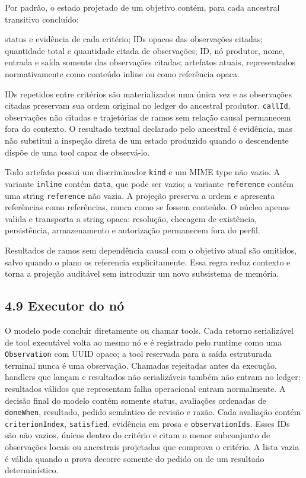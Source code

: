 \documentclass[12pt,a4paper]{article}
\begin{document}
Por padrão, o estado projetado de um objetivo contém, para cada ancestral transitivo concluído:


\noindent \textbullet{} status e evidência de cada critério; \textbullet{} IDs opacos das observações citadas; \textbullet{} quantidade total e quantidade citada de observações; \textbullet{} ID, nó produtor, nome, entrada e saída somente das observações citadas; \textbullet{} artefatos atuais, representados normativamente como conteúdo inline ou como referência opaca.\par

IDs repetidos entre critérios são materializados uma única vez e as observações citadas preservam sua ordem original no ledger do ancestral produtor. \texttt{callId}, observações não citadas e trajetórias de ramos sem relação causal permanecem fora do contexto. O resultado textual declarado pelo ancestral é evidência, mas não substitui a inspeção direta de um estado produzido quando o descendente dispõe de uma tool capaz de observá-lo.

Todo artefato possui um discriminador \texttt{kind} e um MIME type não vazio. A variante \texttt{inline} contém \texttt{data}, que pode ser vazio; a variante \texttt{reference} contém uma string \texttt{reference} não vazia. A projeção preserva a ordem e apresenta referências como referências, nunca como se fossem conteúdo. O núcleo apenas valida e transporta a string opaca: resolução, checagem de existência, persistência, armazenamento e autorização permanecem fora do perfil.

Resultados de ramos sem dependência causal com o objetivo atual são omitidos, salvo quando o plano os referencia explicitamente. Essa regra reduz contexto e torna a projeção auditável sem introduzir um novo subsistema de memória.



\subsection*{4.9 Executor do nó}

O modelo pode concluir diretamente ou chamar tools. Cada retorno serializável de tool executável volta ao mesmo nó e é registrado pelo runtime como uma \texttt{Observation} com UUID opaco; a tool reservada para a saída estruturada terminal nunca é uma observação. Chamadas rejeitadas antes da execução, handlers que lançam e resultados não serializáveis também não entram no ledger; resultados válidos que representam falha operacional entram normalmente. A decisão final do modelo contém somente status, avaliações ordenadas de \texttt{doneWhen}, resultado, pedido semântico de revisão e razão. Cada avaliação contém \texttt{criterionIndex}, \texttt{satisfied}, evidência em prosa e \texttt{observationIds}. Esses IDs são não vazios, únicos dentro do critério e citam o menor subconjunto de observações locais ou ancestrais projetadas que comprova o critério. A lista vazia é válida quando a prova decorre somente do pedido ou de um resultado determinístico.
\end{document}
